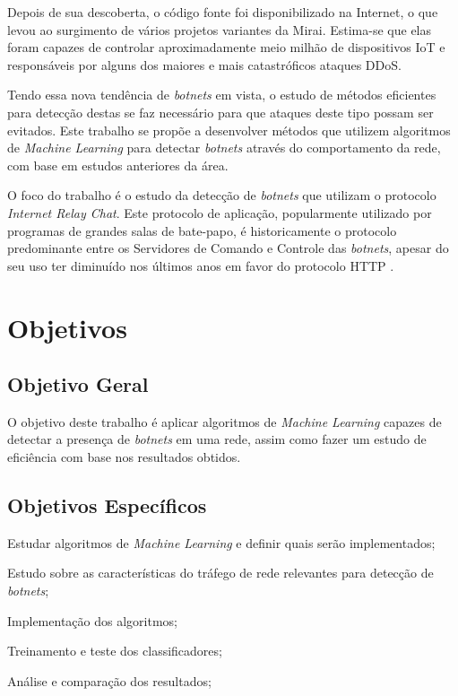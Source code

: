 Depois de sua descoberta, o código fonte foi disponibilizado na Internet, o que levou ao surgimento de vários projetos variantes da Mirai. Estima-se que elas foram capazes de controlar aproximadamente meio milhão de dispositivos IoT e responsáveis por alguns dos maiores e mais catastróficos ataques DDoS. \cite{mliot}

Tendo essa nova tendência de \textit{botnets} em vista, o estudo de métodos eficientes para detecção destas se faz necessário para que ataques deste tipo possam ser evitados. Este trabalho se propõe a desenvolver métodos que utilizem algoritmos de \textit{Machine Learning} para detectar \textit{botnets} através do comportamento da rede, com base em estudos anteriores da área. 

O foco do trabalho é o estudo da detecção de \textit{botnets} que utilizam o protocolo \textit{Internet Relay Chat}. Este protocolo de aplicação, popularmente utilizado por programas de grandes salas de bate-papo, é historicamente o protocolo predominante entre os Servidores de Comando e Controle das \textit{botnets}, apesar do seu uso ter diminuído nos últimos anos em favor do protocolo HTTP \cite{logregbot}. 

\section{Objetivos}
\label{i.objetivos}

\subsection{Objetivo Geral}
\label{i.objetivo-geral}

O objetivo deste trabalho é aplicar algoritmos de \textit{Machine Learning} capazes de detectar a presença de \textit{botnets} em uma rede, assim como fazer um estudo de eficiência com base nos resultados obtidos.

\subsection{Objetivos Específicos}
\label{i.objetivos-especificos}

\begin{alineas}

\item Estudar algoritmos de \textit{Machine Learning} e definir quais serão implementados;

\item Estudo sobre as características do tráfego de rede relevantes para detecção de \textit{botnets};

\item Implementação dos algoritmos;

\item Treinamento e teste dos classificadores;

\item Análise e comparação dos resultados;

\end{alineas}

